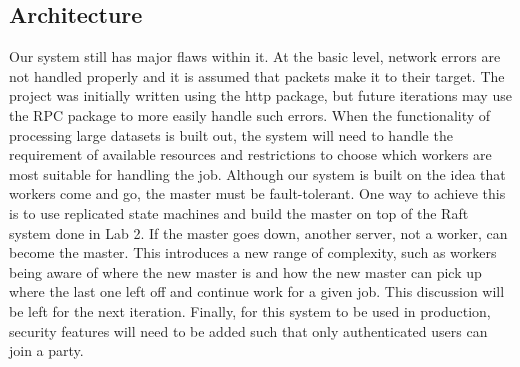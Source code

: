 \documentclass[twoside]{article}
\begin{document}
\subsection{Architecture}
Our system still has major flaws within it. At the basic level, network errors are not handled properly and it is assumed that packets make it to their target. The project was initially written using the http package, but future iterations may use the RPC package to more easily handle such errors. When the functionality of processing large datasets is built out, the system will need to handle the requirement of available resources and restrictions  to choose which workers are most suitable for handling the job. Although our
system is built on the idea that workers come and go, the master must be fault-tolerant. One way to achieve this is to use replicated state machines and build the master on top of the Raft system done in Lab 2. If the master goes down, another server, not a worker, can become the master. This introduces a new range of complexity, such as workers being aware of where the new master is and how the new master can pick up where the last one left off and continue work for a given job. This
discussion will be left for the next iteration. Finally, for this system to be used in production, security features will need to be added such that only authenticated users can join a party. 







\end{document}
